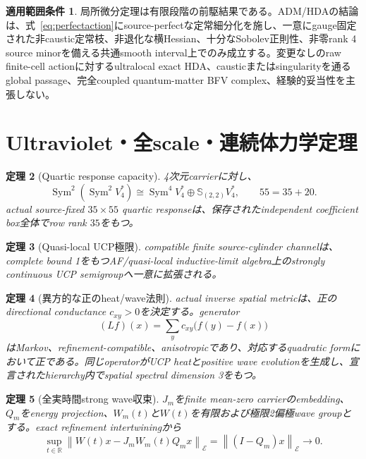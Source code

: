 \documentclass[11pt]{article}
\newtheorem{theorem}{定理}[section]
\theoremstyle{definition}
\newtheorem{scope}[theorem]{適用範囲条件}
\theoremstyle{remark}
\newcommand{\Sym}{\operatorname{Sym}}
\newcommand{\cE}{\mathcal E}
\begin{document}
\begin{scope}
局所微分定理は有限段階の前駆結果である。ADM/HDAの結論は、式~\eqref{eq:perfectaction}にsource-perfectな定常細分化を施し、一意にgauge固定された非caustic定常枝、非退化な横Hessian、十分なSobolev正則性、非零rank 4 source minorを備える共通smooth interval上でのみ成立する。変更なしのraw finite-cell actionに対するultralocal exact HDA、causticまたはsingularityを通るglobal passage、完全coupled quantum-matter BFV complex、経験的妥当性を主張しない。
\end{scope}

\section{Ultraviolet・全scale・連続体力学定理}

\begin{theorem}[Quartic response capacity]
4次元carrierに対し、
\begin{equation}
\Sym^2(\Sym^2V_4^*)
\cong\Sym^4V_4^*\oplus\mathbb S_{(2,2)}V_4^*,
\qquad 55=35+20.
\label{eq:quarticdecomp}
\end{equation}
actual source-fixed $35\times55$ quartic responseは、保存されたindependent coefficient box全体でrow rank $35$をもつ。
\end{theorem}

\begin{theorem}[Quasi-local UCP極限]
compatible finite source-cylinder channelは、complete bound 1をもつAF/quasi-local inductive-limit algebra上のstrongly continuous UCP semigroupへ一意に拡張される。
\end{theorem}

\begin{theorem}[異方的な正のheat/wave法則]
actual inverse spatial metricは、正のdirectional conductance $c_{xy}>0$を決定する。generator
\begin{equation}
(Lf)(x)=\sum_yc_{xy}\bigl(f(y)-f(x)\bigr)
\label{eq:conductance}
\end{equation}
はMarkov、refinement-compatible、anisotropicであり、対応するquadratic formにおいて正である。同じoperatorがUCP heatとpositive wave evolutionを生成し、宣言されたhierarchy内でspatial spectral dimension 3をもつ。
\end{theorem}

\begin{theorem}[全実時間strong wave収束]
$J_m$をfinite mean-zero carrierのembedding、$Q_m$をenergy projection、$W_m(t)$と$W(t)$を有限および極限2偏極wave groupとする。exact refinement intertwiningから
\begin{equation}
\sup_{t\in\mathbb R}
\left\|W(t)x-J_mW_m(t)Q_mx\right\|_{\cE}
=\left\|(I-Q_m)x\right\|_{\cE}
\longrightarrow0.
\label{eq:strongwave}
\end{equation}
\end{theorem}
\end{document}
